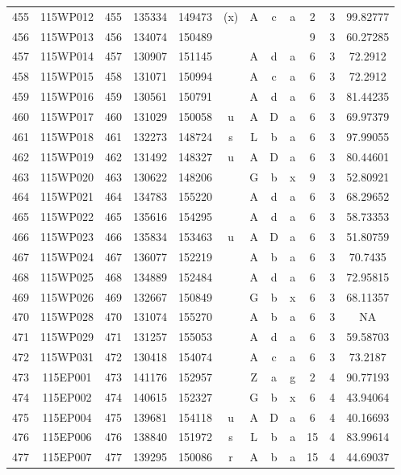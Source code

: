 \begin{tabular}{|*{12}{c|}}
455 & 115WP012 & 455 & 135334 & 149473 & (x) & A & c & a & 2 & 3 & 99.82777 \\ 
456 & 115WP013 & 456 & 134074 & 150489 &  &  &  &  & 9 & 3 & 60.27285 \\ 
457 & 115WP014 & 457 & 130907 & 151145 &  & A & d & a & 6 & 3 & 72.2912 \\ 
458 & 115WP015 & 458 & 131071 & 150994 &  & A & c & a & 6 & 3 & 72.2912 \\ 
459 & 115WP016 & 459 & 130561 & 150791 &  & A & d & a & 6 & 3 & 81.44235 \\ 
460 & 115WP017 & 460 & 131029 & 150058 & u & A & D & a & 6 & 3 & 69.97379 \\ 
461 & 115WP018 & 461 & 132273 & 148724 & s & L & b & a & 6 & 3 & 97.99055 \\ 
462 & 115WP019 & 462 & 131492 & 148327 & u & A & D & a & 6 & 3 & 80.44601 \\ 
463 & 115WP020 & 463 & 130622 & 148206 &  & G & b & x & 9 & 3 & 52.80921 \\ 
464 & 115WP021 & 464 & 134783 & 155220 &  & A & d & a & 6 & 3 & 68.29652 \\ 
465 & 115WP022 & 465 & 135616 & 154295 &  & A & d & a & 6 & 3 & 58.73353 \\ 
466 & 115WP023 & 466 & 135834 & 153463 & u & A & D & a & 6 & 3 & 51.80759 \\ 
467 & 115WP024 & 467 & 136077 & 152219 &  & A & b & a & 6 & 3 & 70.7435 \\ 
468 & 115WP025 & 468 & 134889 & 152484 &  & A & d & a & 6 & 3 & 72.95815 \\ 
469 & 115WP026 & 469 & 132667 & 150849 &  & G & b & x & 6 & 3 & 68.11357 \\ 
470 & 115WP028 & 470 & 131074 & 155270 &  & A & b & a & 6 & 3 & NA \\ 
471 & 115WP029 & 471 & 131257 & 155053 &  & A & d & a & 6 & 3 & 59.58703 \\ 
472 & 115WP031 & 472 & 130418 & 154074 &  & A & c & a & 6 & 3 & 73.2187 \\ 
473 & 115EP001 & 473 & 141176 & 152957 &  & Z & a & g & 2 & 4 & 90.77193 \\ 
474 & 115EP002 & 474 & 140615 & 152327 &  & G & b & x & 6 & 4 & 43.94064 \\ 
475 & 115EP004 & 475 & 139681 & 154118 & u & A & D & a & 6 & 4 & 40.16693 \\ 
476 & 115EP006 & 476 & 138840 & 151972 & s & L & b & a & 15 & 4 & 83.99614 \\ 
477 & 115EP007 & 477 & 139295 & 150086 & r & A & b & a & 15 & 4 & 44.69037 \\ 

\end{tabular}
